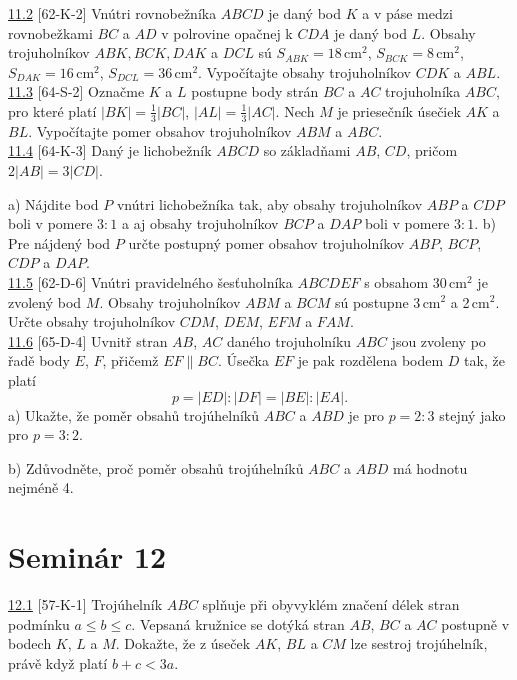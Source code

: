 \noindent \ul{11.2} [62-K-2] Vnútri rovnobežníka $ABCD$ je daný bod $K$ a v páse medzi rovnobežkami $BC$ a $AD$ v polrovine opačnej k $CDA$ je daný bod $L$. Obsahy trojuholníkov $ABK, BCK, DAK$ a $DCL$ sú $S_{ABK} = 18$\,cm$^2$, $S_{BCK} = 8$\,cm$^2$, $S_{DAK} = 16$\,cm$^2$, $S_{DCL} = 36$\,cm$^2$. Vypočítajte obsahy trojuholníkov $CDK$ a $ABL$.\\

\noindent \ul{11.3} [64-S-2] Označme $K$ a $L$ postupne body strán $BC$ a $AC$ trojuholníka $ABC$, pro které platí $|BK|= \frac{1}{3}|BC|$, $|AL| =\frac{1}{3}|AC|$. Nech $M$ je priesečník úsečiek $AK$ a $BL$. Vypočítajte pomer obsahov trojuholníkov $ABM$ a $ABC$.\\

\noindent \ul{11.4} [64-K-3]  Daný je lichobežník $ABCD$ so základňami $AB$, $CD$, pričom $2|AB| = 3|CD|$.

a) Nájdite bod $P$ vnútri lichobežníka tak, aby obsahy trojuholníkov $ABP$ a $CDP$ boli v pomere $3 : 1$ a aj obsahy trojuholníkov $BCP$ a $DAP$ boli v pomere $3 : 1$.
b) Pre nájdený bod $P$ určte postupný pomer obsahov trojuholníkov $ABP$, $BCP$, $CDP$ a $DAP$.\\

\noindent \ul{11.5} [62-D-6] Vnútri pravidelného šesťuholníka $ABCDEF$ s obsahom 30\,cm$^2$ je zvolený bod $M$. Obsahy trojuholníkov $ABM$ a $BCM$ sú postupne 3\,cm$^2$ a 2\,cm$^2$. Určte obsahy trojuholníkov $CDM$, $DEM$, $EFM$ a $FAM$.\\

\noindent \ul{11.6} [65-D-4] Uvnitř stran $AB$, $AC$ daného trojuholníku $ABC$
jsou zvoleny po řadě body $E$, $F$, přičemž $EF \parallel BC$. Úsečka $EF$ je
pak rozdělena bodem $D$ tak, že platí $$p = |ED| : |DF | = |BE| : |EA|.$$
a) Ukažte, že poměr obsahů trojúhelníků $ABC$ a $ABD$ je pro $p = 2 : 3$ stejný jako pro $p = 3 : 2$.

b) Zdůvodněte, proč poměr obsahů trojúhelníků $ABC$ a $ABD$ má hodnotu nejméně 4.\\

\section*{Seminár 12}

\noindent \ul{12.1} [57-K-1] Trojúhelník $ABC$ splňuje při obyvyklém značení délek stran podmínku $a
\leq b \leq c$. Vepsaná kružnice se dotýká stran $AB$, $BC$ a $AC$ postupně v bodech $K$, $L$ a $M$.
Dokažte, že z úseček $AK$, $BL$ a $CM$ lze sestroj trojúhelník, právě když platí $b + c <
3a$.\\

